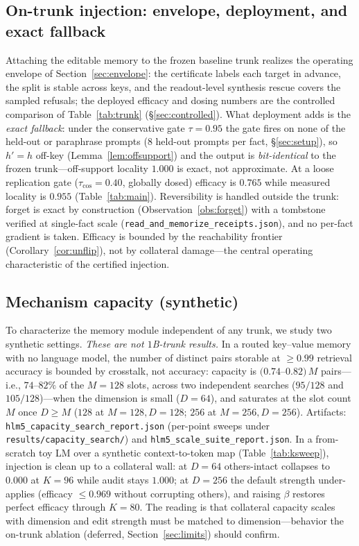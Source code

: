 \documentclass[10pt,twocolumn]{article}
\theoremstyle{remark}
\begin{document}
\subsection{On-trunk injection: envelope, deployment, and exact fallback}
\label{sec:spread}

Attaching the editable memory to the frozen baseline trunk realizes the
operating envelope of Section~\ref{sec:envelope}: the certificate labels each
target in advance, the split is stable across keys, and the readout-level
synthesis rescue covers the sampled refusals; the deployed efficacy and dosing
numbers are the controlled comparison of Table~\ref{tab:trunk}
(\S\ref{sec:controlled}). What deployment adds is the \emph{exact fallback}:
under the conservative gate $\tau=0.95$ the gate fires on none of the held-out
or paraphrase prompts ($8$ held-out prompts per fact, \S\ref{sec:setup}), so
$h'=h$ off-key (Lemma~\ref{lem:offsupport}) and the output is
\emph{bit-identical} to the frozen trunk---off-support locality $1.000$ is
exact, not approximate. At a loose replication gate ($\tau_{\cos}=0.40$,
globally dosed) efficacy is $0.765$ while measured locality is $0.955$
(Table~\ref{tab:main}). Reversibility is handled outside the trunk: forget is
exact by construction (Observation~\ref{obs:forget}) with a tombstone verified
at single-fact scale (\texttt{read\_and\_memorize\_receipts.json}), and no
per-fact gradient is taken. Efficacy is bounded by the reachability frontier
(Corollary~\ref{cor:unflip}), not by collateral damage---the central operating
characteristic of the certified injection.

\subsection{Mechanism capacity (synthetic)}
\label{sec:capacity}

To characterize the memory module independent of any trunk, we study two synthetic
settings. \emph{These are not $1$B-trunk results.} In a routed key--value memory
with no language model, the number of distinct pairs storable at $\ge 0.99$
retrieval accuracy is bounded by crosstalk, not accuracy: capacity is
$(0.74$--$0.82)\,M$ pairs---i.e., $74$--$82\%$ of the $M{=}128$ slots, across two
independent searches ($95/128$ and $105/128$)---when the dimension is small
($D{=}64$), and
saturates at the slot count $M$ once $D\ge M$ ($128$ at $M{=}128,D{=}128$; $256$ at
$M{=}256,D{=}256$). Artifacts: \texttt{hlm5\_capacity\_search\_report.json}
(per-point sweeps under \texttt{results/capacity\_search/}) and
\texttt{hlm5\_scale\_suite\_report.json}. In a from-scratch toy LM over a synthetic context-to-token map
(Table~\ref{tab:ksweep}), injection is clean up to a collateral wall: at $D{=}64$
others-intact collapses to $0.000$ at $K{=}96$ while audit stays $1.000$; at
$D{=}256$ the default strength under-applies (efficacy $\le 0.969$ without
corrupting others), and raising $\beta$ restores perfect efficacy through $K{=}80$.
The reading is that collateral capacity scales with dimension and edit strength
must be matched to dimension---behavior the on-trunk ablation (deferred,
Section~\ref{sec:limits}) should confirm.
\end{document}
